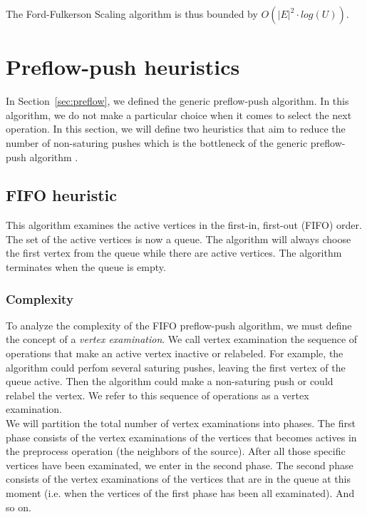 The Ford-Fulkerson Scaling algorithm is thus bounded by $O(|E|^2 \cdot log(U))$.

\section{Preflow-push heuristics}

In Section~\ref{sec:preflow}, we defined the generic preflow-push algorithm. In this algorithm, we do not make a particular choice when it comes to select the next operation. In this section, we will define two heuristics that aim to reduce the number of non-saturing pushes which is the bottleneck of the generic preflow-push algorithm \cite{networkflows}.

\subsection{FIFO heuristic}

This algorithm examines the active vertices in the first-in, first-out (FIFO) order. The set of the active vertices is now a queue. The algorithm will always choose the first vertex from the queue while there are active vertices. The algorithm terminates when the queue is empty. 

\subsubsection{Complexity}

To analyze the complexity of the FIFO preflow-push algorithm, we must define the concept of a \textit{vertex examination}. We call vertex examination the sequence of operations that make an active vertex inactive or relabeled. For example, the algorithm could perfom several saturing pushes, leaving the first vertex of the queue active. Then the algorithm could make a non-saturing push or could relabel the vertex. We refer to this sequence of operations as a vertex examination.\\

We will partition the total number of vertex examinations into phases. The first phase consists of the vertex examinations of the vertices that becomes actives in the preprocess operation (the neighbors of the source). After all those specific vertices have been examinated, we enter in the second phase. The second phase consists of the vertex examinations of the vertices that are in the queue at this moment (i.e. when the vertices of the first phase has been all examinated). And so on.\\


